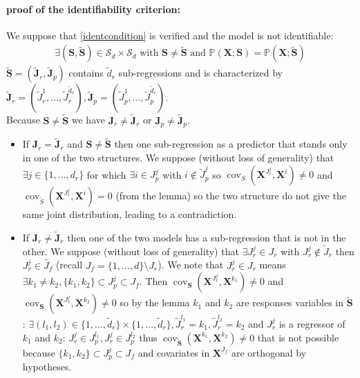 \documentclass[12pt,a4paper]{report}
\begin{document}
\begin{appendices}
\paragraph{proof of the identifiability criterion:} We suppose that \ref{identcondition} is verified and the model is not identifiable:
\begin{eqnarray}
	\exists (\boldsymbol{S},\tilde{\boldsymbol{S}}) \in \mathcal{S}_d\times \mathcal{S}_d \textrm{ with } \boldsymbol{S} \neq \tilde{\boldsymbol{S}} \textrm{ and }
	\mathbb{P}(\boldsymbol{X};\boldsymbol{S})=\mathbb{P}(\boldsymbol{X};\tilde{\boldsymbol{S}})
 \end{eqnarray}
 $\tilde{\boldsymbol{S}}=(\tilde{\boldsymbol{J}}_r,\tilde{\boldsymbol{J}}_p)$ contains $\tilde{d}_r$ sub-regressions and is characterized by $\tilde{\boldsymbol{J}}_r=(\tilde{J}_r^1,\dots,\tilde{J}_r^{\tilde{d}_r}),\tilde{\boldsymbol{J}}_p=(\tilde{J}_p^1,\dots,\tilde{J}_p^{\tilde{d}_r})$.\\
Because $\boldsymbol{S}\neq \tilde{\boldsymbol{S}} $ we have $\boldsymbol{J}_r\neq \tilde{\boldsymbol{J}}_r$ or $\boldsymbol{J}_p\neq \tilde{\boldsymbol{J}}_p$.
\begin{itemize}
\item If $\boldsymbol{J}_r = \tilde{\boldsymbol{J}}_r$ and $\boldsymbol{S}\neq \tilde{\boldsymbol{S}}$ then one sub-regression as a predictor that stands only in one of the two structures. We suppose (without loss of generality) that $\exists j \in \{1,\dots,d_r\}$ for which
$\exists i \in J_p^j$ with $i \notin \tilde{J}_p^j$ so $\operatorname{cov}_{S}(\boldsymbol{X}^{J_r^j},\boldsymbol{X}^{i})\neq 0$ and $\operatorname{cov}_{\tilde{S}}(\boldsymbol{X}^{J_r^j},\boldsymbol{X}^{i})= 0$ (from the lemma) so the two structure do not give the same joint distribution, leading to a contradiction.
\item If $\boldsymbol{J}_r\neq \tilde{\boldsymbol{J}}_r$ then one of the two models has a sub-regression that is not in the other. We suppose (without loss of generality) that
 $\exists J_r^j \in J_r$ with $J_r^j \notin \tilde{J}_r$ then $J_r^j\in \tilde{J_f}$ (recall $J_f=\{1,\dots,d \}\setminus J_r$). We note that $J_r^j \in J_r$ means $\exists k_1\neq k_2, \{k_1,k_2 \}\subset J_p^j \subset J_f$. Then $\operatorname{cov}_{\boldsymbol{S}}(\boldsymbol{X}^{J_r^j},\boldsymbol{X}^{k_1})\neq 0$ and $\operatorname{cov}_{\boldsymbol{S}}(\boldsymbol{X}^{J_r^j},\boldsymbol{X}^{k_2})\neq 0 $ so by the lemma $k_1$ and $k_2$ are responses variables in $\tilde{\boldsymbol{S}}$: $\exists (l_1,l_2) \in \{1,\dots,\tilde{d}_r \}\times \{1,\dots,\tilde{d}_r \}, \tilde{J}_r^{l_1}=k_1,\tilde{J}_r^{l_2}=k_2$ and $J_r^j$ is a regressor of $k_1$ and $k_2$: $J_r^j \in J_p^{l_1}, J_r^j \in J_p^{l_2}$ thus $\operatorname{cov}_{\tilde{\boldsymbol{S}}}(\boldsymbol{X}^{k_1},\boldsymbol{X}^{k_2})\neq 0$ that is not possible because $ \{k_1,k_2 \}\subset J_p^j \subset J_f$ and covariates in $\boldsymbol{X}^{J_f}$ are orthogonal by hypotheses.
\end{itemize}


\end{appendices}
\end{document}
